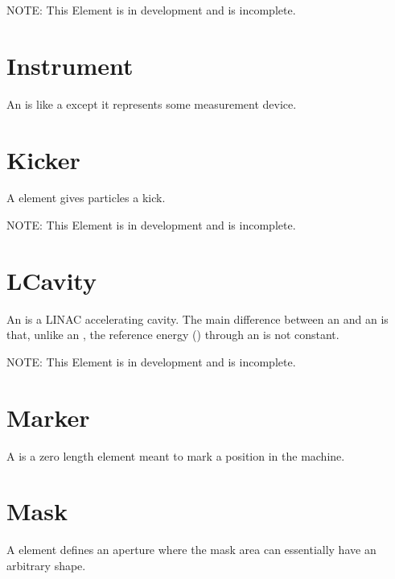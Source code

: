 NOTE: This Element is in development and is incomplete.

\section{Instrument}
\label{s:instrument}

An  is like a  except it represents some measurement device.

\section{Kicker}
\label{s:kicker}

A  element gives particles a kick.

NOTE: This Element is in development and is incomplete.

\section{LCavity}
\label{s:lcavity}

An  is a LINAC accelerating cavity.  The main difference between an  and an
 is that, unlike an , the reference energy () through
an  is not constant.

NOTE: This Element is in development and is incomplete.

\section{Marker}
\label{s:marker}

A  is a zero length element meant to mark a position in the machine. 

\section{Mask}
\label{s:mask}

A  element defines an aperture where the mask area can
essentially have an arbitrary shape. 

